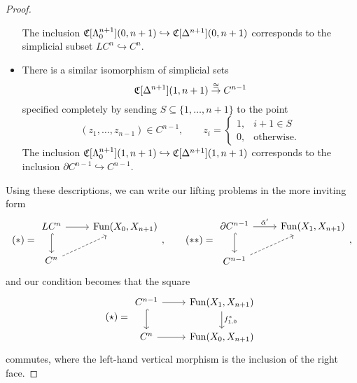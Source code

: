 \documentclass[main.tex]{subfiles}
\begin{document}
\begin{proof}
\begin{itemize}
      The inclusion $\mathfrak{C}[\Lambda^{n+1}_{0}](0, n+1) \hookrightarrow \mathfrak{C}[\Delta^{n+1}](0, n+1)$ corresponds to the simplicial subset $LC^{n} \hookrightarrow C^{n}$.

    \item There is a similar isomorphism of simplicial sets
      \begin{equation*}
        \mathfrak{C}[\Delta^{n+1}](1, n+1) \overset{\cong}{\to} C^{n-1}
      \end{equation*}
      specified completely by sending $S \subseteq \{1, \ldots, n+1\}$ to the point
      \begin{equation*}
        (z_{1}, \ldots, z_{n-1}) \in C^{n-1},\qquad z_{i} =
        \begin{cases}
          1, & i+1 \in S \\
          0, &\text{otherwise.}
        \end{cases}
      \end{equation*}
      The inclusion $\mathfrak{C}[\Lambda^{n+1}_{0}](1, n+1) \hookrightarrow \mathfrak{C}[\Delta^{n+1}](1, n+1)$ corresponds to the inclusion $\partial C^{n-1} \hookrightarrow C^{n-1}$.
  \end{itemize}

  Using these descriptions, we can write our lifting problems in the more inviting form
  \begin{equation*}
    (*) =
    \begin{tikzcd}
      LC^{n}
      \arrow[r]
      \arrow[d, hook]
      & \Fun(X_{0}, X_{n+1})
      \\
      C^{n}
      \arrow[ur, dashed]
    \end{tikzcd},\qquad (**) =
    \begin{tikzcd}
      \partial C^{n-1}
      \arrow[r, "\tilde{\alpha}'"]
      \arrow[d, hook]
      & \Fun(X_{1}, X_{n+1})
      \\
      C^{n-1}
      \arrow[ur, dashed]
    \end{tikzcd},
  \end{equation*}
  and our condition becomes that the square
  \begin{equation*}
    (\star) =
    \begin{tikzcd}
      C^{n-1}
      \arrow[r]
      \arrow[d, hook]
      & \Fun(X_{1}, X_{n+1})
      \arrow[d, "f_{1,0}^{*}"]
      \\
      C^{n}
      \arrow[r]
      & \Fun(X_{0}, X_{n+1})
    \end{tikzcd}
  \end{equation*}
  commutes, where the left-hand vertical morphism is the inclusion of the right face.


\end{proof}
\end{document}
